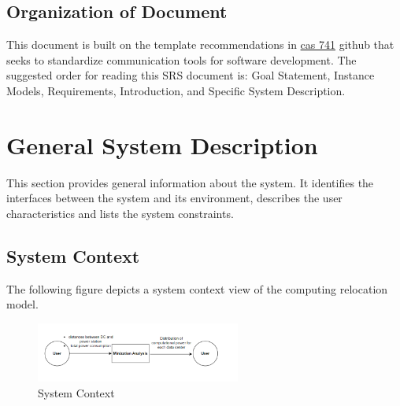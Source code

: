\documentclass[12pt]{article}
\begin{document}
\subsection{Organization of Document}

{This document is built on the template recommendations in \href{https://github.com/smiths/capTemplate}{cas 741} github that seeks to standardize communication tools for software development. The suggested order for reading this SRS document is: Goal Statement, Instance Models, Requirements, Introduction, and Specific System Description.}

\section{General System Description}

{This section provides general information about the system.  It identifies the interfaces between the system and its environment, describes the user
characteristics and lists the system constraints.}

\subsection{System Context}

{The following figure depicts a system context view of the computing relocation model.}

\begin{figure}[h!]
\begin{center}
 \includegraphics[width=0.6\textwidth]{system context Figure.png}
\caption{System Context}
\label{Fig_SystemContext} 
\end{center}
\end{figure}
\end{document}

